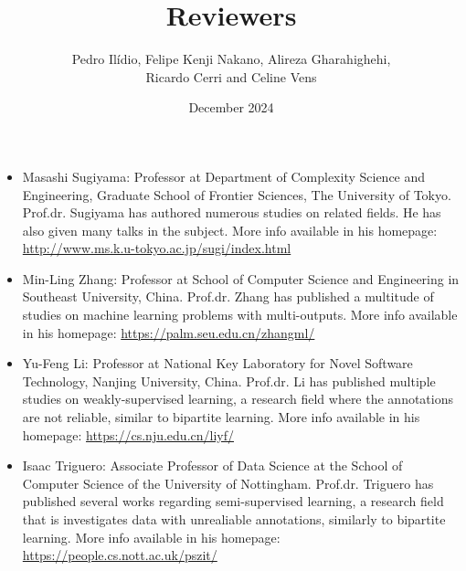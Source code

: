 \documentclass{article}
\title{Reviewers}
\author{Pedro Ilídio, Felipe Kenji Nakano, Alireza Gharahighehi, \\ Ricardo Cerri and Celine Vens}
\date{December 2024}
\begin{document}
%
\maketitle

\begin{itemize}
\item Masashi Sugiyama: Professor at Department of Complexity Science and Engineering, Graduate School of Frontier Sciences, The University of Tokyo. Prof.dr. Sugiyama has authored numerous studies on related fields. He has also given many talks in the subject. More info available in his homepage: \url{http://www.ms.k.u-tokyo.ac.jp/sugi/index.html}    

\item Min-Ling Zhang:  Professor at School of Computer Science and Engineering in Southeast University, China. Prof.dr. Zhang has published a multitude of studies on machine learning problems with multi-outputs. More info available in his homepage: \url{https://palm.seu.edu.cn/zhangml/}     

\item Yu-Feng Li: Professor at National Key Laboratory for Novel Software Technology, Nanjing University, China. Prof.dr. Li has published multiple studies on weakly-supervised learning, a research field where the annotations are not reliable, similar to bipartite learning. More info available in his homepage: \url{https://cs.nju.edu.cn/liyf/}     

\item Isaac Triguero: Associate Professor of Data Science at the School of Computer Science of the University of Nottingham. Prof.dr. Triguero has published several works regarding semi-supervised learning, a research field that is investigates data with unrealiable annotations, similarly to bipartite learning.  More info available in his homepage: \url{https://people.cs.nott.ac.uk/pszit/}     

\end{itemize}
\end{document}
